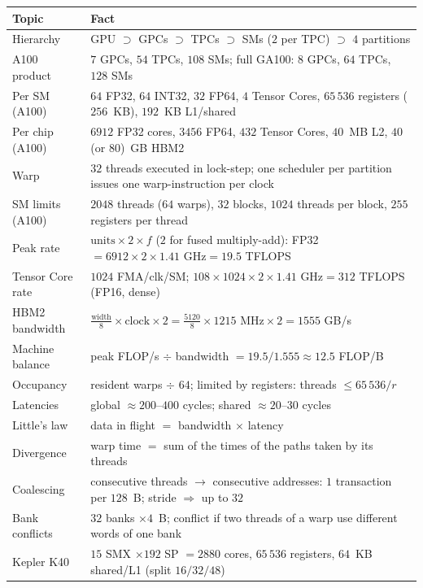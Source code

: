 \begin{center}
\small
\begin{tabularx}{\linewidth}{@{}l X@{}}
\toprule
\textbf{Topic} & \textbf{Fact}\\
\midrule
Hierarchy & GPU $\supset$ GPCs $\supset$ TPCs $\supset$ SMs ($2$ per TPC) $\supset$ $4$ partitions\\
A100 product & $7$ GPCs, $54$ TPCs, $108$ SMs; full GA100: $8$ GPCs, $64$ TPCs, $128$ SMs\\
Per SM (A100) & $64$ FP32, $64$ INT32, $32$ FP64, $4$ Tensor Cores, $65\,536$ registers ($256$~KB), $192$~KB L1/shared\\
Per chip (A100) & $6912$ FP32 cores, $3456$ FP64, $432$ Tensor Cores, $40$~MB L2, $40$ (or $80$)~GB HBM2\\
Warp & $32$ threads executed in lock-step; one scheduler per partition issues one warp-instruction per clock\\
SM limits (A100) & $2048$ threads ($64$ warps), $32$ blocks, $1024$ threads per block, $255$ registers per thread\\
Peak rate & $\text{units}\times2\times f$ ($2$ for fused multiply-add): FP32 $=6912\times2\times1.41\text{ GHz}=19.5$ TFLOPS\\
Tensor Core rate & $1024$ FMA/clk/SM; $108\times1024\times2\times1.41\text{ GHz}=312$ TFLOPS (FP16, dense)\\
HBM2 bandwidth & $\tfrac{\text{width}}{8}\times\text{clock}\times2=\tfrac{5120}{8}\times1215\text{ MHz}\times2=1555$ GB/s\\
Machine balance & peak FLOP/s $\div$ bandwidth $=19.5/1.555\approx12.5$ FLOP/B\\
Occupancy & resident warps $\div$ $64$; limited by registers: threads $\le65\,536/r$\\
Latencies & global $\approx200$--$400$ cycles; shared $\approx20$--$30$ cycles\\
Little's law & data in flight $=$ bandwidth $\times$ latency\\
Divergence & warp time $=$ sum of the times of the paths taken by its threads\\
Coalescing & consecutive threads $\to$ consecutive addresses: $1$ transaction per $128$~B; stride $\Rightarrow$ up to $32$\\
Bank conflicts & $32$ banks $\times4$~B; conflict if two threads of a warp use different words of one bank\\
Kepler K40 & $15$ SMX $\times192$ SP $=2880$ cores, $65\,536$ registers, $64$~KB shared/L1 (split $16/32/48$)\\
\bottomrule
\end{tabularx}
\end{center}


